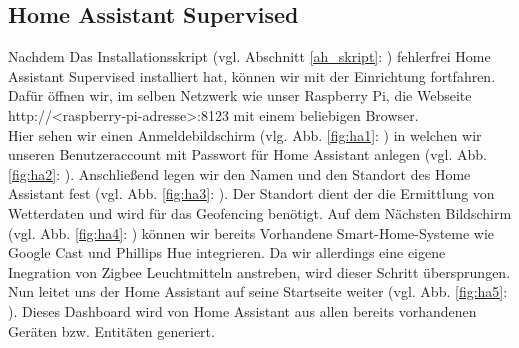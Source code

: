 \subsection{Home Assistant Supervised}\label{sw_hassio}
Nachdem Das Installationsskript (vgl. Abschnitt \ref{ah_skript}: ) fehlerfrei Home Assistant Supervised installiert hat, können wir mit der Einrichtung fortfahren. 
Dafür öffnen wir, im selben Netzwerk wie unser Raspberry Pi, die Webseite http://<raspberry-pi-adresse>:8123 mit einem beliebigen Browser.\\
\noindent Hier sehen wir einen Anmeldebildschirm (vlg. Abb. \ref{fig:ha1}: ) in welchen wir unseren Benutzeraccount mit Passwort für Home Assistant anlegen (vgl. Abb. \ref{fig:ha2}: ). 
Anschließend legen wir den Namen und den Standort des Home Assistant fest (vgl. Abb. \ref{fig:ha3}: ). 
Der Standort dient der die Ermittlung von Wetterdaten und wird für das Geofencing benötigt. 
Auf dem Nächsten Bildschirm (vgl. Abb. \ref{fig:ha4}: ) können wir bereits Vorhandene Smart-Home-Systeme wie Google Cast und Phillips Hue integrieren. 
Da wir allerdings eine eigene Inegration von Zigbee Leuchtmitteln anstreben, wird dieser Schritt übersprungen. 
Nun leitet uns der Home Assistant auf seine Startseite weiter (vgl. Abb. \ref{fig:ha5}: ). 
Dieses Dashboard wird von Home Assistant aus allen bereits vorhandenen Geräten bzw. Entitäten generiert. 
